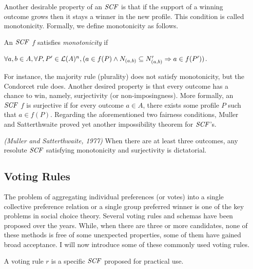 Another desirable property of an $\it{SCF}$ is that if the support of a winning
outcome grows then it stays a winner in the new profile.
This condition is called monotonicity. Formally, we define monotonicity as follows.

\begin{definition}
	An $\it{SCF}$ $f$ satisfies \textit{monotonicity} if 
	\begin{center}
		$\forall a,b \in A, \forall P,P' \in \mathcal{L}(A)^n, (a \in f(P) \wedge 
		N_{(a,b)} \subseteq N'_{(a,b)} \Rightarrow a \in f(P'))$.
	\end{center}
\end{definition}

For instance, the majority rule (plurality) does not satisfy monotonicity, but 
the Condorcet rule does.  Another desired property is that every outcome
has a chance to win, namely, surjectivity (or non-imposingness).  More formally, 
an $\it{SCF}$ $f$ is surjective if for every outcome $a \in A$, there exists
some profile $P$ such that $a \in f(P)$.
Regarding the aforementioned two fairness conditions, Muller and Satterthwaite \cite{Mull_Satt}
proved yet another impossibility theorem for $\it{SCF}$'s.

\begin{thm}
\label{thm:Mull_Satt}
\emph{(Muller and Satterthwaite, 1977)}
	When there are at least three outcomes,
	any resolute $\it{SCF}$ satisfying monotonicity and surjectivity is dictatorial.
\end{thm}



\subsection{Voting Rules}
The problem of aggregating individual preferences (or votes) into a single
collective preference relation or a single group preferred winner is
one of the key problems in social choice theory.
Several voting rules and schemas have been proposed over the years.
While, when there are three or more candidates, none of these
methods is free of some unexpected properties,
some of them have gained broad acceptance.
I will now introduce some of these commonly used voting rules.

\begin{definition}
	A voting rule $r$ is a specific $\it{SCF}$ proposed for practical use.
\end{definition}

